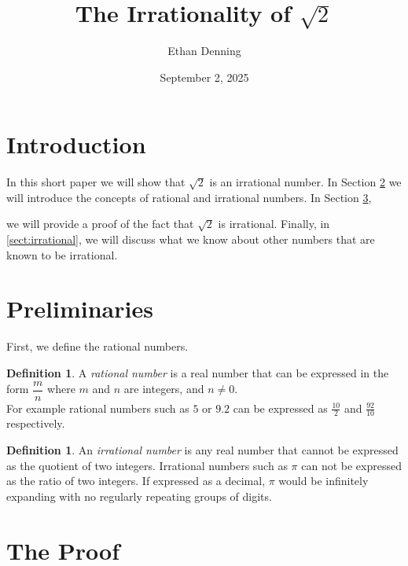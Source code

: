 \documentclass[12pt]{article}
\title{The Irrationality of $\sqrt {2}$ }
\author{Ethan Denning}
\date{September 2, 2025}
\theoremstyle{plain}
\theoremstyle{definition}
\newtheorem{defi}[thm]{Definition}
\begin{document}
\maketitle

    \section{Introduction}
    
    In this short paper we will show that $\sqrt{2}$ is an irrational number. In Section \ref{sect:prelim} we will introduce the concepts of rational and irrational numbers. In Section \ref{sect:proof},
    
    
    we will provide a proof of the fact that $\sqrt{2}$ is irrational. Finally, in \ref{sect:irrational}, we will discuss what we know about other numbers that are known to be irrational. 

    \section{Preliminaries} \label{sect:prelim}

    First, we define the rational numbers.

    \begin{defi}\label{def:rational}
        A \emph{rational number} is a real number that can be expressed in the form $\dfrac{m}{n}$ where $m$ and $n$ are integers, and $n\ne 0$. \\
        For example rational numbers such as $5$ or $9.2$ can be expressed as $\frac{10}{2}$ and $\frac{92}{10}$ respectively. 
    \end{defi}

    \begin{defi}\label{defi:irrationality}
        An \emph{irrational number} is any real number that cannot be expressed as the quotient of two integers. Irrational numbers such as $\pi$ can not be expressed as the ratio of two integers. If expressed as a decimal, $\pi$ would be infinitely expanding with no regularly repeating groups of digits. 
    \end{defi}
    
    \section{The Proof} \label{sect:proof}
\end{document}
